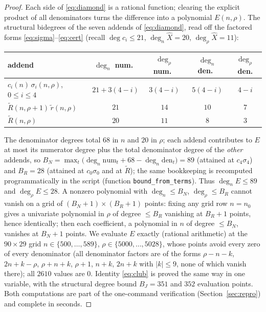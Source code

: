 \documentclass[11pt]{article}
\theoremstyle{plain}
\theoremstyle{definition}
\theoremstyle{remark}
\newcommand{\Rt}{\widetilde{R}}
\newcommand{\Xh}{\widehat{X}}
\begin{document}
\begin{proof}
Each side of \eqref{eq:diamond} is a rational function; clearing the explicit product of all
denominators turns the difference into a polynomial $E(n,\rho)$. The structural bidegrees of the
seven addends of \eqref{eq:diamond}, read off the factored forms
\eqref{eq:sigma}--\eqref{eq:cert} (recall $\deg c_i\le21$, $\deg_n\Xh=20$, $\deg_\rho\Xh=11$):
\begin{center}\small
\begin{tabular}{lcccc}
\toprule
addend & $\deg_n$ num.\ & $\deg_\rho$ num.\ & $\deg_n$ den.\ & $\deg_\rho$ den.\\
\midrule
$c_i(n)\,\sigma_i(n,\rho)$, $0\le i\le 4$ & $21+3(4{-}i)$ & $3(4{-}i)$ & $5(4{-}i)$ & $4{-}i$\\
$\Rt(n,\rho{+}1)\,\tilde r(n,\rho)$ & $21$ & $14$ & $10$ & $7$\\
$\Rt(n,\rho)$ & $20$ & $11$ & $8$ & $3$\\
\bottomrule
\end{tabular}
\end{center}
The denominator degrees total $68$ in $n$ and $20$ in $\rho$; each addend contributes to $E$ at
most its numerator degree plus the total denominator degree of the \emph{other} addends, so
$B_N=\max_t\bigl(\deg_n\mathrm{num}_t+68-\deg_n\mathrm{den}_t\bigr)=89$ (attained at
$c_4\sigma_4$) and $B_R=28$ (attained at $c_0\sigma_0$ and at $\Rt$); the same bookkeeping is
recomputed programmatically in the script (function \texttt{bound\_from\_terms}). Thus
$\deg_n E\le 89$ and $\deg_\rho E\le 28$. A nonzero polynomial with
$\deg_n\le B_N$, $\deg_\rho\le B_R$ cannot vanish on a grid of $(B_N{+}1)\times(B_R{+}1)$ points:
fixing any grid row $n=n_0$ gives a univariate polynomial in $\rho$ of degree $\le B_R$ vanishing
at $B_R{+}1$ points, hence identically; then each coefficient, a polynomial in $n$ of degree
$\le B_N$, vanishes at $B_N{+}1$ points. We evaluate $E$ exactly (rational arithmetic) at the
$90\times29$ grid $n\in\{500,\dots,589\}$, $\rho\in\{5000,\dots,5028\}$, whose points avoid every
zero of every denominator (all denominator factors are of the forms $\rho-n-k$, $2n+k-\rho$,
$\rho+n+k$, $\rho+1$, $n+k$, $2n+k$ with $|k|\le9$, none of which vanish there); all $2610$
values are $0$. Identity \eqref{eq:club} is proved the same way in one variable, with the
structural degree bound $B_J=351$ and $352$ evaluation points. Both computations are part of the
one-command verification (Section~\ref{sec:repro}) and complete in seconds.
\end{proof}
\end{document}

